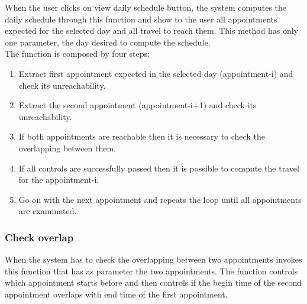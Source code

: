 When the user clicks on view daily schedule button, the system computes the daily schedule through this function and show to the user all appointments expected for the selected day and all travel to reach them.
This method has only one parameter, the day desired to compute the schedule.\\
The function is composed by four steps:
\begin{enumerate}
	\item Extract first appointment expected in the selected day (appointment-i) and check its unreachability.
	\item Extract the second appointment (appointment-i+1) and check its unreachability.
	\item If both appointments are reachable then it is necessary to check the overlapping between them.
	\item If all controls are successfully passed then it is possible to compute the travel for the appointment-i.
	\item Go on with the next appointment and repeats the loop until all appointments are examinated.
\end{enumerate}

\begin{algorithmic}
		
				\State {}
			\EndIf
		\EndFor
		
			\State {}
			\State {}
		\EndIf
	\EndFunction
\end{algorithmic}

\subsubsection{Check overlap}

When the system has to check the overlapping between two appointments invokes this function that has as parameter the two appointments.
The function controls which appointment starts before and then controls if the begin time of the second appointment overlaps with end time of the first appointment.

